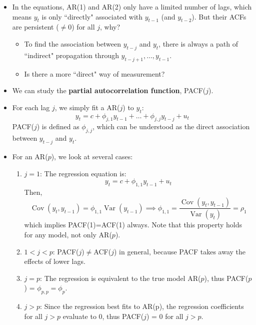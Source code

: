 \documentclass[notitlepage]{article}
\DeclareMathOperator{\Var}{Var}
\DeclareMathOperator{\Cov}{Cov}
\begin{document}
\begin{itemize}
    \[
    \begin{cases}
        \rho_0 = \phi_1 \rho_1 + \phi_2 \rho_2 + \frac{\sigma^2}{\gamma_0} = 1\\
        \rho_1 = \phi_1 + \phi_2 \rho_1 \\
        \rho_j = \phi_1 \rho_{j-1} + \phi_2 \rho_{j-2} \text{ for all } j>1
    \end{cases}
    \]
    Solving for \(j=1,2\), we can get \(\rho_1 = \frac{\phi_1}{1-\phi_2}\), \(\rho_2 = \frac{\phi_1^2}{1-\phi_2}+\phi_2\), and the rest can be solved by iterated substitution in the last equation.
    \item In the equations, AR(1) and AR(2) only have a limited number of lags, which means \(y_t\) is only ``directly" associated with \(y_{t-1}\) (and \(y_{t-2}\)).  But their ACFs are persistent ($\ne 0$) for all \(j\), why?
    \begin{itemize}
        \item To find the association between \(y_{t-j}\) and \(y_t\), there is always a path of ``indirect" propagation through \(y_{t-j+1}, \dots, y_{t-1}\).
        \item Is there a more ``direct" way of measurement?
    \end{itemize}
    \item We can study the \textbf{partial autocorrelation function}, PACF(\(j\)).
    \item For each lag \(j\), we simply fit a AR(\(j\)) to \(y_t\):
    \[
    y_t = c + \phi_{j,1} y_{t-1} + \dots + \phi_{j,j}y_{t-j} + u_t
    \]
    PACF(\(j\)) is defined as \(\phi_{j,j}\), which can be understood as the direct association between \(y_{t-j}\) and \(y_t\). 
    \item For an AR(\(p\)), we look at several cases:

\begin{enumerate}
    \item \(j=1\): The regression equation is:
    \[
    y_t = c + \phi_{1,1} y_{t-1} + u_t
    \]
    Then,
    \[
    \Cov(y_t,y_{t-1}) = \phi_{1,1} \Var(y_{t-1}) \implies \phi_{1,1} =\frac{\Cov(y_t,y_{t-1})}{\Var(y_{t})} = \rho_1
    \]
    which implies PACF(1)=ACF(1) always. Note that this property holds for any model, not only AR(\(p\)).
    \item \(1 < j < p\): PACF(\(j\))$\ne$ACF(\(j\)) in general, because PACF takes away the effects of lower lags.
    \item \(j = p\): The regression is equivalent to the true model AR(\(p\)), thus PACF(\(p\)) = \(\phi_{p,p} = \phi_p\).
    \item \(j > p\): Since the regression best fits to AR(p), the regression coefficients for all \(j>p\) evaluate to 0, thus PACF(\(j\)) = 0 for all \(j>p\).
\end{enumerate}


\end{itemize}
\end{document}
